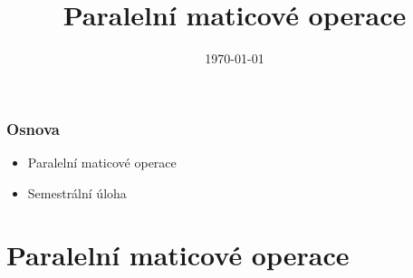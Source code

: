 \documentclass[usenames,dvipsnames,9pt]{beamer}
\title{Paralelní maticové operace}
\date{\today}
\institute{B4B36PDV -- Paralelní a distribuované výpočty}
\begin{document}
\maketitle

\begin{frame}
  \frametitle{Osnova}
  \begin{itemize}
    \item Paralelní maticové operace
    \item Semestrální úloha\\[1.5em]
  \end{itemize}
\end{frame}


%
%
%
%
%
%
% 
% 
%

\section{Paralelní maticové operace}
\end{document}
